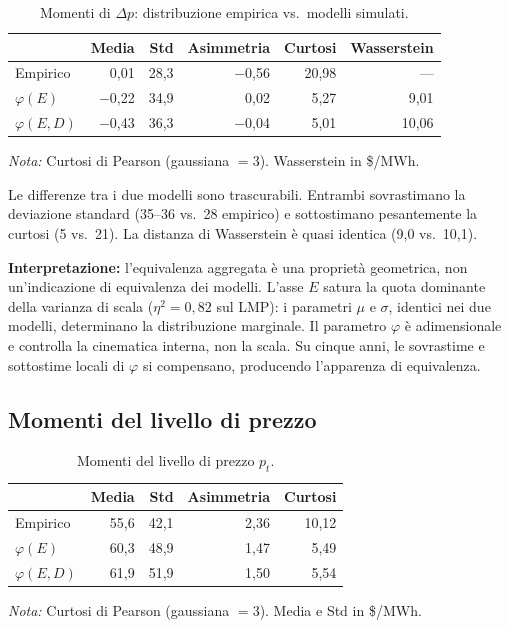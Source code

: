 \documentclass[12pt]{article}
\begin{document}
\begin{table}[H]
\centering
\caption{Momenti di $\Delta p$: distribuzione empirica vs.\ modelli simulati.}
\label{tab:moments}
\begin{tabular}{lrrrrr}
\toprule
 & Media & Std & Asimmetria & Curtosi & Wasserstein \\
\midrule
Empirico       &  0,01 & 28,3 & $-$0,56 & 20,98 & --- \\
$\varphi(E)$   & $-$0,22 & 34,9 &    0,02 &  5,27 & 9,01 \\
$\varphi(E,D)$ & $-$0,43 & 36,3 & $-$0,04 &  5,01 & 10,06 \\
\bottomrule
\end{tabular}
\par\smallskip
\footnotesize\textit{Nota:} Curtosi di Pearson (gaussiana $= 3$). Wasserstein in \$/MWh.
\end{table}

Le differenze tra i due modelli sono trascurabili.
Entrambi sovrastimano la deviazione standard (35--36 vs.\ 28 empirico) e sottostimano pesantemente la curtosi (5 vs.\ 21).
La distanza di Wasserstein è quasi identica (9,0 vs.\ 10,1).

\textbf{Interpretazione:} l'equivalenza aggregata è una proprietà geometrica, non un'indicazione di equivalenza dei modelli.
L'asse $E$ satura la quota dominante della varianza di scala ($\eta^2 = 0{,}82$ sul LMP): i parametri $\mu$ e $\sigma$, identici nei due modelli, determinano la distribuzione marginale.
Il parametro $\varphi$ è adimensionale e controlla la cinematica interna, non la scala.
Su cinque anni, le sovrastime e sottostime locali di $\varphi$ si compensano, producendo l'apparenza di equivalenza.

\subsection{Momenti del livello di prezzo}

\begin{table}[H]
\centering
\caption{Momenti del livello di prezzo $p_t$.}
\label{tab:moments_level}
\begin{tabular}{lrrrr}
\toprule
 & Media & Std & Asimmetria & Curtosi \\
\midrule
Empirico       & 55,6 & 42,1 & 2,36 & 10,12 \\
$\varphi(E)$   & 60,3 & 48,9 & 1,47 &  5,49 \\
$\varphi(E,D)$ & 61,9 & 51,9 & 1,50 &  5,54 \\
\bottomrule
\end{tabular}
\par\smallskip
\footnotesize\textit{Nota:} Curtosi di Pearson (gaussiana $= 3$). Media e Std in \$/MWh.
\end{table}
\end{document}
